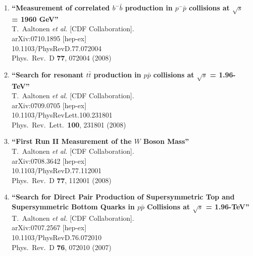 \documentclass{article}
\begin{document}
\begin{enumerate}
\item%
{\bf ``Measurement of correlated $b^- \bar{b}$ production in $p^- \bar{p}$ collisions at $\sqrt{s}$ = 1960 GeV''}
  \\{}T.~Aaltonen {\it et al.}  [CDF Collaboration].
  \\{}arXiv:0710.1895 [hep-ex]
    \\{}10.1103/PhysRevD.77.072004
\\{}Phys.\ Rev.\ D {\bf 77}, 072004 (2008) %


\item%
{\bf ``Search for resonant $t \bar{t}$ production in $p \bar{p}$ collisions at $\sqrt{s}$ = 1.96-TeV''}
  \\{}T.~Aaltonen {\it et al.}  [CDF Collaboration].
  \\{}arXiv:0709.0705 [hep-ex]
    \\{}10.1103/PhysRevLett.100.231801
\\{}Phys.\ Rev.\ Lett.\  {\bf 100}, 231801 (2008) %


\item%
{\bf ``First Run II Measurement of the $W$ Boson Mass''}
  \\{}T.~Aaltonen {\it et al.}  [CDF Collaboration].
  \\{}arXiv:0708.3642 [hep-ex]
    \\{}10.1103/PhysRevD.77.112001
\\{}Phys.\ Rev.\ D {\bf 77}, 112001 (2008) %


\item%
{\bf ``Search for Direct Pair Production of Supersymmetric Top and Supersymmetric Bottom Quarks in $p \bar{p}$ Collisions at $\sqrt{s}$ = 1.96-TeV''}
  \\{}T.~Aaltonen {\it et al.}  [CDF Collaboration].
  \\{}arXiv:0707.2567 [hep-ex]
    \\{}10.1103/PhysRevD.76.072010
\\{}Phys.\ Rev.\ D {\bf 76}, 072010 (2007) %



\end{enumerate}
\end{document}

